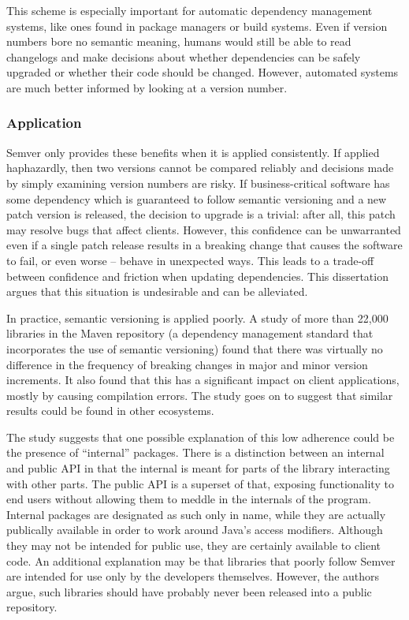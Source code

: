 \documentclass{l4proj}
\begin{document}
This scheme is especially important for automatic dependency
management systems, like ones found in package managers or build
systems. Even if version numbers bore no semantic meaning, humans
would still be able to read changelogs and make decisions about whether
dependencies can be safely upgraded or whether their code should be
changed. However, automated systems are much better informed by
looking at a version number.

\subsubsection{Application}

Semver only provides these benefits when it is applied consistently.
If applied haphazardly, then two versions cannot be compared reliably
and decisions made by simply examining version numbers are risky. If
business-critical software has some dependency which is guaranteed to
follow semantic versioning and a new patch version is released, the
decision to upgrade is a trivial: after all, this patch may resolve
bugs that affect clients. However, this confidence can be unwarranted
even if a single patch release results in a breaking change that
causes the software to fail, or even worse -- behave in unexpected ways.
This leads to a trade-off between confidence and friction when
updating dependencies. This dissertation argues that this situation is
undesirable and can be alleviated.

In practice, semantic versioning is applied poorly. A
study \cite{SemverMaven} of more than 22,000 libraries in the Maven
repository (a dependency management standard that incorporates the use
of semantic versioning) found that there was virtually no difference in the
frequency of breaking changes in major and minor version increments.
It also found that this has a significant impact on client
applications, mostly by causing compilation errors. The study goes on
to suggest that similar results could be found in other ecosystems.

The study suggests that one possible explanation of this low adherence
could be the presence of ``internal'' packages. There is a distinction
between an internal and public API in that the internal is meant for
parts of the library interacting with other parts. The public API is a
superset of that, exposing functionality to end users without allowing
them to meddle in the internals of the program. Internal packages are
designated as such only in name, while they are actually
publically available in order to work around Java's access modifiers.
Although they may not be intended for public use, they are certainly
available to client code. An additional explanation may be that
libraries that poorly follow Semver are intended for use only by the
developers themselves. However, the authors argue, such libraries
should have probably never been released into a public repository.
\end{document}
